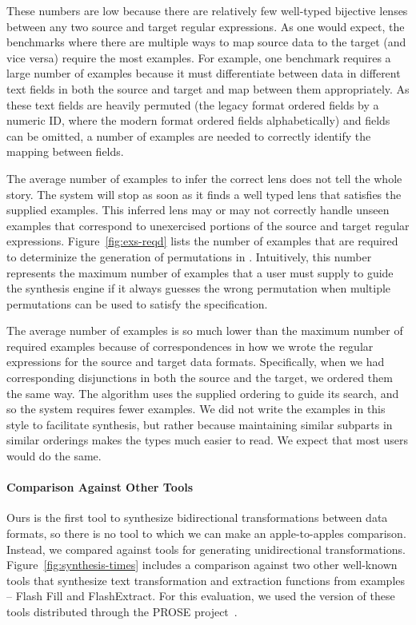 \documentclass[12pt]{article}
\begin{document}
{These numbers are low because there are relatively few well-typed
bijective lenses between any two source and target regular expressions. 
As one would expect, the benchmarks where there are multiple ways to
map source data to the target (and vice versa) require the most examples.
For example, one benchmark requires a large number of
examples because it
must differentiate between data in different text fields in both the
source and target and map between them appropriately.  As these text fields are
heavily permuted
(the legacy format ordered fields by a numeric ID, where
the modern format ordered fields alphabetically) and fields can be
omitted, a number of examples are needed to correctly identify the mapping
between fields.

The average number of examples to
infer the correct lens does not tell the whole story.  The system will
stop as soon as it finds a well typed lens that satisfies the supplied examples.
This inferred lens may or may not 
correctly handle unseen examples that correspond to
unexercised portions of the source and target regular expressions.
Figure~\ref{fig:exs-reqd} lists
the number of examples that are required to determinize the generation of
permutations in \RigidSynth{}.
Intuitively, this number represents the maximum number of
examples that a user must supply to guide the synthesis engine if it
always guesses the wrong permutation when multiple permutations can be used to
satisfy the specification. 

The average number of examples is so much lower than the maximum
number of required examples because of correspondences in how we wrote
the regular expressions for the source and target data formats. 
Specifically, when we had corresponding disjunctions in both the
source and the target, we ordered them the same way.  The algorithm
uses the supplied ordering to guide its search, and so the system
requires fewer examples.   We did not write the examples in this style
to facilitate synthesis, but rather because maintaining similar
subparts in similar orderings makes the types much easier to 
read. We expect that most users would do the same.

\paragraph*{Comparison Against Other Tools}
%
Ours is the first tool to synthesize bidirectional transformations between data
formats, so there is no tool to which we can make an apple-to-apples comparison.
Instead, we compared against tools for generating unidirectional
transformations. 
Figure~\ref{fig:synthesis-times} includes a comparison against two other
well-known tools that synthesize
text transformation and extraction functions from examples -- Flash Fill and FlashExtract.  For this
evaluation, we used the version of these tools distributed through the
PROSE project~\cite{prose}.

}
\end{document}
